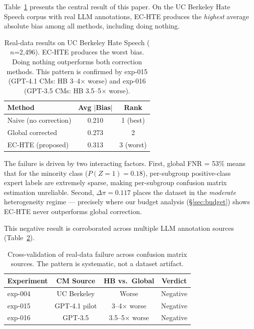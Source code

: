 \documentclass[11pt]{article}
\begin{document}
Table~\ref{tab:real-data} presents the central result of this paper.
On the UC Berkeley Hate Speech corpus with real LLM annotations, EC-HTE produces the \emph{highest} average absolute bias among all methods, including doing nothing.

\begin{table}[t]
\centering
\small
\begin{tabular}{lcc}
\toprule
Method & Avg $|$Bias$|$ & Rank \\
\midrule
Naive (no correction) & 0.210 & 1 (best) \\
Global corrected & 0.273 & 2 \\
EC-HTE (proposed) & 0.313 & 3 (worst) \\
\bottomrule
\end{tabular}
\caption{Real-data results on UC Berkeley Hate Speech ($n$=2{,}496). EC-HTE produces the worst bias. Doing nothing outperforms both correction methods. This pattern is confirmed by exp-015 (GPT-4.1 CMs: HB 3--4$\times$ worse) and exp-016 (GPT-3.5 CMs: HB 3.5--5$\times$ worse).}
\label{tab:real-data}
\end{table}

The failure is driven by two interacting factors.
First, global FNR = 53\% means that for the minority class ($P(Z{=}1) = 0.18$), per-subgroup positive-class expert labels are extremely sparse, making per-subgroup confusion matrix estimation unreliable.
Second, $\Delta\pi = 0.117$ places the dataset in the \emph{moderate} heterogeneity regime --- precisely where our budget analysis (\S\ref{sec:budget}) shows EC-HTE never outperforms global correction.

This negative result is corroborated across multiple LLM annotation sources (Table~\ref{tab:cross-validation}).

\begin{table}[t]
\centering
\small
\begin{tabular}{lccc}
\toprule
Experiment & CM Source & HB vs.\ Global & Verdict \\
\midrule
exp-004 & UC Berkeley & Worse & Negative \\
exp-015 & GPT-4.1 pilot & 3--4$\times$ worse & Negative \\
exp-016 & GPT-3.5 & 3.5--5$\times$ worse & Negative \\
\bottomrule
\end{tabular}
\caption{Cross-validation of real-data failure across confusion matrix sources. The pattern is systematic, not a dataset artifact.}
\label{tab:cross-validation}
\end{table}
\end{document}
